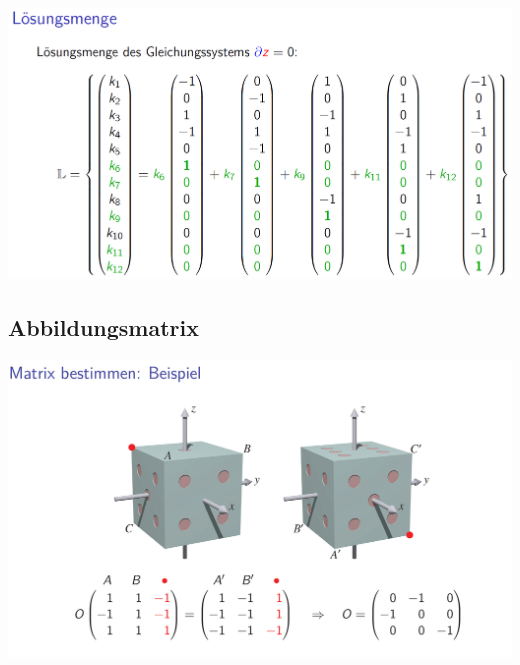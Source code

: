 		   \includegraphics[width=0.8\linewidth]{Bilder/widerstand5} \\ 
	
	\subsection{Abbildungsmatrix}
		\includegraphics[width=0.8\linewidth]{Bilder/matrix-bestimmen_wuerfel-drehen.png} \\ 